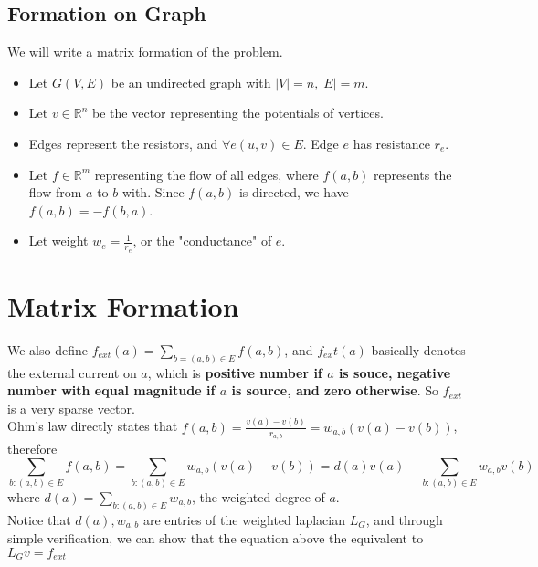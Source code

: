 \documentclass[12pt]{article}
\begin{document}
\subsection{Formation on Graph}
We will write a matrix formation of the problem.\\
\begin{itemize}
	\item Let $G(V, E)$ be an undirected graph with $|V| = n, |E| = m$.
	\item Let $v \in \mathbb{R}^n$ be the vector representing the potentials of vertices.
	\item Edges represent the resistors, and $\forall e(u, v) \in E$. Edge $e$ has resistance $r_e$.
	\item Let $f \in \mathbb{R}^m$ representing the flow of all edges, where $f(a, b)$ represents the flow from $a$ to $b$ with. Since $f(a, b)$ is directed, we have $f(a, b) = -f(b, a)$.
	\item Let weight $w_e= \frac{1}{r_e}$, or the "conductance" of $e$.
\end{itemize}

\section{Matrix Formation}
We also define $ f _ { e x t } ( a ) = \sum _ { b = ( a , b ) \in E } f ( a , b )$, and $f_{ex}t(a)$ basically denotes the external current on $a$, which is \textbf{positive number if $a$ is souce, negative number with equal magnitude if $a$ is source, and zero otherwise}. So $f_{ext}$ is a very sparse vector.\\
\newline
Ohm's law directly states that $f ( a , b ) = \frac { v ( a ) - v ( b ) } { r _ { a , b } } = w _ { a , b } ( v ( a ) - v ( b ) )$, therefore $$\sum _ { b : ( a , b ) \in E } f ( a , b ) = \sum _ { b : ( a , b ) \in E } w _ { a , b } ( v ( a ) - v ( b ) ) = d ( a ) v ( a ) - \sum _ { b : ( a , b ) \in E } w _ { a, b  } v ( b )$$ where $d(a) = \sum_{b : ( a , b ) \in E }w_{a, b}$, the weighted degree of $a$.\\
\newline
Notice that $d(a), w_{a, b}$ are entries of the weighted laplacian $L_G$, and through simple verification, we can show that the equation above the equivalent to $L_Gv = f_{ext}$
\end{document}
